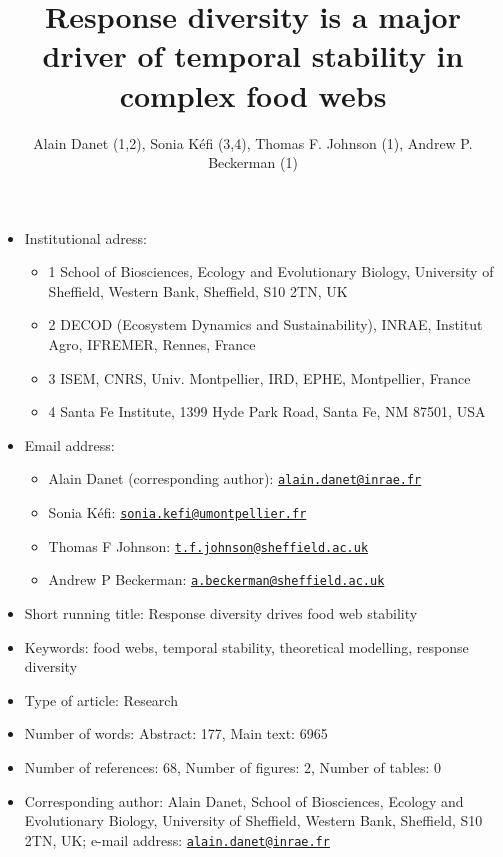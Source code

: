 \documentclass[
]{article}
\title{Response diversity is a major driver of temporal stability in complex food webs}
\author{Alain Danet (1,2), Sonia Kéfi (3,4), Thomas F. Johnson (1), Andrew P. Beckerman (1)}
\date{}
\providecommand{\tightlist}{%
  \setlength{\itemsep}{0pt}\setlength{\parskip}{0pt}}
\begin{document}
\maketitle

\begin{singlespace}

\begin{itemize}
\item
  Institutional adress:

  \begin{itemize}
  \tightlist
  \item
    1 School of Biosciences, Ecology and Evolutionary Biology, University of Sheffield, Western Bank, Sheffield, S10 2TN, UK
  \item
    2 DECOD (Ecosystem Dynamics and Sustainability), INRAE, Institut Agro, IFREMER, Rennes, France
  \item
    3 ISEM, CNRS, Univ. Montpellier, IRD, EPHE, Montpellier, France
  \item
    4 Santa Fe Institute, 1399 Hyde Park Road, Santa Fe, NM 87501, USA
  \end{itemize}
\item
  Email address:

  \begin{itemize}
  \tightlist
  \item
    Alain Danet (corresponding author): \href{mailto:alain.danet@inrae.fr}{\nolinkurl{alain.danet@inrae.fr}}
  \item
    Sonia Kéfi: \href{mailto:sonia.kefi@umontpellier.fr}{\nolinkurl{sonia.kefi@umontpellier.fr}}
  \item
    Thomas F Johnson: \href{mailto:t.f.johnson@sheffield.ac.uk}{\nolinkurl{t.f.johnson@sheffield.ac.uk}}
  \item
    Andrew P Beckerman: \href{mailto:a.beckerman@sheffield.ac.uk}{\nolinkurl{a.beckerman@sheffield.ac.uk}}
  \end{itemize}
\item
  Short running title: Response diversity drives food web stability
\item
  Keywords: food webs, temporal stability, theoretical modelling, response
  diversity
\item
  Type of article: Research
\item
  Number of words: Abstract: 177, Main text: 6965
\item
  Number of references: 68, Number of figures: 2, Number of tables: 0
\item
  Corresponding author: Alain Danet, School of Biosciences, Ecology and
  Evolutionary Biology, University of Sheffield, Western Bank, Sheffield, S10
  2TN, UK; e-mail address: \href{mailto:alain.danet@inrae.fr}{\nolinkurl{alain.danet@inrae.fr}}
\end{itemize}

\end{singlespace}
\end{document}
